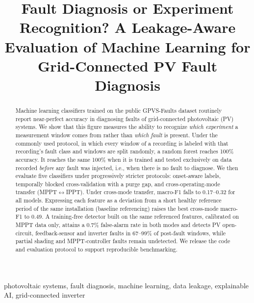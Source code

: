\documentclass[conference]{IEEEtran}
\begin{document}
\title{Fault Diagnosis or Experiment Recognition? A Leakage-Aware Evaluation of Machine Learning for Grid-Connected PV Fault Diagnosis}

\author{
}

\maketitle

\begin{abstract}
Machine learning classifiers trained on the public GPVS-Faults dataset routinely report near-perfect accuracy in diagnosing faults of grid-connected photovoltaic (PV) systems. We show that this figure measures the ability to recognize \emph{which experiment} a measurement window comes from rather than \emph{which fault} is present. Under the commonly used protocol, in which every window of a recording is labeled with that recording's fault class and windows are split randomly, a random forest reaches 100\% accuracy. It reaches the same 100\% when it is trained and tested exclusively on data recorded \emph{before} any fault was injected, i.e., when there is no fault to diagnose. We then evaluate five classifiers under progressively stricter protocols: onset-aware labels, temporally blocked cross-validation with a purge gap, and cross-operating-mode transfer (MPPT$\leftrightarrow$IPPT). Under cross-mode transfer, macro-F1 falls to 0.17--0.32 for all models. Expressing each feature as a deviation from a short healthy reference period of the same installation (baseline referencing) raises the best cross-mode macro-F1 to 0.49. A training-free detector built on the same referenced features, calibrated on MPPT data only, attains a 0.7\% false-alarm rate in both modes and detects PV open-circuit, feedback-sensor and inverter faults in 67--99\% of post-fault windows, while partial shading and MPPT-controller faults remain undetected. We release the code and evaluation protocol to support reproducible benchmarking.
\end{abstract}

\begin{IEEEkeywords}
photovoltaic systems, fault diagnosis, machine learning, data leakage, explainable AI, grid-connected inverter
\end{IEEEkeywords}
\end{document}
